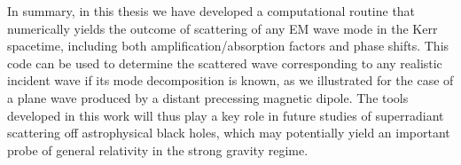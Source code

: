 In summary, in this thesis we have developed a computational routine that numerically yields the outcome of scattering of any EM wave mode in the Kerr spacetime, including both amplification/absorption factors and phase shifts. 
This code can be used to determine the scattered wave corresponding to any realistic incident wave if its mode decomposition is known, as we illustrated for the case of a plane wave produced by a distant precessing magnetic dipole.
The tools developed in this work will thus play a key role in future studies of superradiant scattering off astrophysical black holes, which may potentially yield an important probe of general relativity in the strong gravity regime.